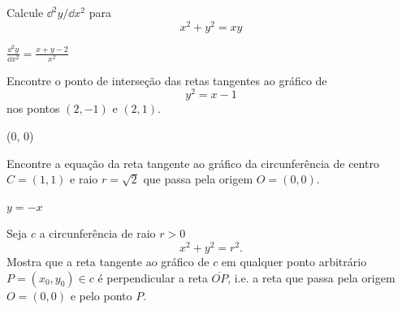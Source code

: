 \begin{exer}
  Calcule $\dd^2 y/\dd x^2$ para
  \begin{equation}
    x^2 + y^2 = xy
  \end{equation}
\end{exer}
\begin{resp}
  $\displaystyle \frac{\dd^2 y}{\dd x^2} = \frac{x + y - 2}{x^2}$
\end{resp}  

\begin{exer}
  Encontre o ponto de interseção das retas tangentes ao gráfico de
  \begin{equation}
    y^2  = x - 1
  \end{equation}
  nos pontos $(2, -1)$ e $(2, 1)$.
\end{exer}
\begin{resp}
  (0, 0)
\end{resp}

\begin{exer}
  Encontre a equação da reta tangente ao gráfico da circunferência de centro $C = (1,1)$ e raio $r=\sqrt{2}$ que passa pela origem $O = (0,0)$.  
\end{exer}
\begin{resp}
  $y = -x$
\end{resp}

\begin{exer}
  Seja $c$ a circunferência de raio $r> 0$
  \begin{equation}
    x^2 + y^2 = r^2.
  \end{equation}
  Mostra que a reta tangente ao gráfico de $c$ em qualquer ponto arbitrário $P = (x_0, y_0)\in c$ é perpendicular a reta $\overline{OP}$, i.e. a reta que passa pela origem $O = (0, 0)$ e pelo ponto $P.$
\end{exer}
